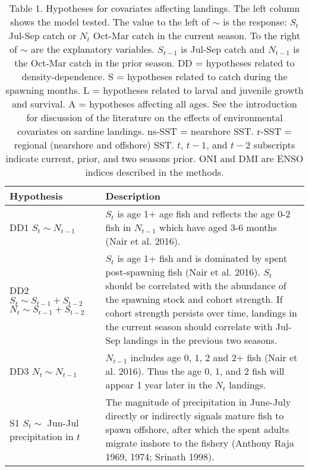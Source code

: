 \documentclass[]{article}
\author{}
\date{\vspace{-2.5em}}
\begin{document}
\renewcommand{\arraystretch}{1.2}

\begin{table}

\caption{\label{tab:print-table-hyp}Table 1. Hypotheses for covariates affecting landings.  The left column shows the model tested. The value to the left of $\sim$ is the response: $S_t$ Jul-Sep catch or $N_t$ Oct-Mar catch in the current season. To the right of $\sim$ are the explanatory variables. $S_{t-1}$ is Jul-Sep catch and $N_{t-1}$ is the Oct-Mar catch in the prior season. DD = hypotheses related to density-dependence. S = hypotheses related to catch during the spawning months. L = hypotheses related to larval and juvenile growth and survival. A = hypotheses affecting all ages. See the introduction for discussion of the literature on the effects of environmental covariates on sardine landings. ns-SST = nearshore SST. r-SST = regional (nearshore and offshore) SST. $t$, $t-1$, and $t-2$ subscripts indicate current, prior, and two seasons prior. ONI and DMI are ENSO indices described in the methods.}
\centering
\begin{tabular}[t]{>{\raggedright\arraybackslash}p{5.5cm}|>{\raggedright\arraybackslash}p{10cm}}
\hline
Hypothesis & Description\\
\hline
DD1 \newline $S_t \sim N_{t-1}$ & $S_t$ is age 1+ age fish and reflects the age 0-2 fish in $N_{t-1}$ which have aged 3-6 months (Nair et al. 2016).\\
\hline
DD2 \newline $S_t \sim S_{t-1} + S_{t-2}$ \newline $N_t \sim S_{t-1} + S_{t-2}$ & $S_t$ is age 1+ fish and is dominated by spent post-spawning fish (Nair et al. 2016). $S_t$ should be correlated with the abundance of the spawning stock and cohort strength. If cohort strength persists over time, landings in the current season should correlate with Jul-Sep landings in the previous two seasons.\\
\hline
DD3 \newline $N_t \sim N_{t-1}$ & $N_{t-1}$ includes age 0, 1, 2 and 2+ fish (Nair et al. 2016). Thus the age 0, 1, and 2 fish will appear 1 year later in the $N_t$ landings.\\
\hline
S1 \newline $S_t \sim$ Jun-Jul precipitation in $t$ & The magnitude of precipitation in June-July directly or indirectly signals mature fish to spawn offshore, after which the spent adults migrate inshore to the fishery (Anthony Raja 1969, 1974; Srinath 1998).\\

\end{tabular}
\end{table}
\end{document}
